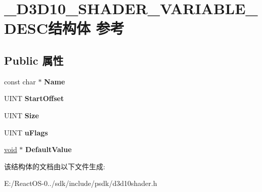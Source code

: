 \hypertarget{struct___d3_d10___s_h_a_d_e_r___v_a_r_i_a_b_l_e___d_e_s_c}{}\section{\+\_\+\+D3\+D10\+\_\+\+S\+H\+A\+D\+E\+R\+\_\+\+V\+A\+R\+I\+A\+B\+L\+E\+\_\+\+D\+E\+S\+C结构体 参考}
\label{struct___d3_d10___s_h_a_d_e_r___v_a_r_i_a_b_l_e___d_e_s_c}
\subsection*{Public 属性}
\begin{DoxyCompactItemize}
\item 
\mbox{\label{struct___d3_d10___s_h_a_d_e_r___v_a_r_i_a_b_l_e___d_e_s_c_a59454a12a184d329506fa7a9ffedcd11}} 
const char $\ast$ {\bfseries Name}
\item 
\mbox{\label{struct___d3_d10___s_h_a_d_e_r___v_a_r_i_a_b_l_e___d_e_s_c_a0d8c3d8ce61b605ef2894476464c0537}} 
U\+I\+NT {\bfseries Start\+Offset}
\item 
\mbox{\label{struct___d3_d10___s_h_a_d_e_r___v_a_r_i_a_b_l_e___d_e_s_c_aa6a78fe60780166a330c3b07ffd4a01c}} 
U\+I\+NT {\bfseries Size}
\item 
\mbox{\label{struct___d3_d10___s_h_a_d_e_r___v_a_r_i_a_b_l_e___d_e_s_c_a5bf35a05d11060764d6117d642faed8b}} 
U\+I\+NT {\bfseries u\+Flags}
\item 
\mbox{\label{struct___d3_d10___s_h_a_d_e_r___v_a_r_i_a_b_l_e___d_e_s_c_ae547a41bea86d1bc33c985b80e5a47a4}} 
\hyperlink{interfacevoid}{void} $\ast$ {\bfseries Default\+Value}
\end{DoxyCompactItemize}


该结构体的文档由以下文件生成\+:\begin{DoxyCompactItemize}
\item 
E\+:/\+React\+O\+S-\/0../sdk/include/psdk/d3d10shader.\+h\end{DoxyCompactItemize}
